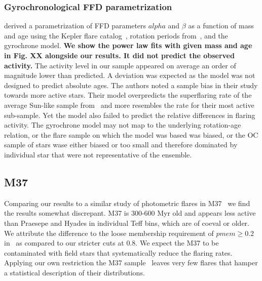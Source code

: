 \documentclass{aa}
\begin{document}
\subsubsection{Gyrochronological FFD parametrization}
\citet{davenport_flaresevolve_2019} derived a parametrization of FFD parameters $alpha$ and $\beta$ as a function of mass and age using the Kepler flare catalog~\citep{davenport_kepler_2016}, rotation periods from~\citet{mcquillan2014}, and the \citet{mamajek2008} gyrochrone model. \textbf{We show the power law fits with given mass and age in Fig. XX alongside our results. It did not predict the observed activity.} The activity level in our sample appeared on average an order of magnitude lower than predicted. A deviation was expected as the model was not designed to predict absolute ages. The authors noted a sample bias in their study towards more active stars. Their model overpredicts the superflaring rate of the average Sun-like sample from~\citet{shibayama_2013} and more resembles the rate for their most active sub-sample. Yet the model also failed to predict the relative differences in flaring activity. The gyrochrone model may not map to the underlying rotation-age relation, or the flare sample on which the \citet{davenport_flaresevolve_2019} model was based was biased, or the OC sample of stars wase either biased or too small and therefore dominated by individual star that were not representative of the ensemble. 
\subsection{M37}
Comparing our results to a similar study of photometric flares in M37~\citep{chang_photometric_2015} we find the results somewhat discrepant. M37 is 300-600 Myr old and appears less active than Praesepe and Hyades in individual Teff bins, which are of coeval or older. We attribute the difference to the loose membership requirement of $pmem \geq 0.2$ in~\cite{chang_photometric_2015} as compared to our stricter cuts at 0.8. We expect the M37 to be contaminated with field stars that systematically reduce the flaring rates. Applying our own restriction the M37 sample~\citep{chang_photometric_2015_data} leaves very few flares that hamper a statistical description of their distributions.
\end{document}
